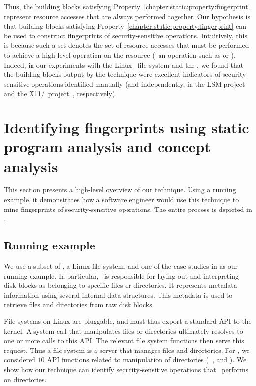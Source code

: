 Thus, the building blocks satisfying
Property~\ref{chapter:static:property:fingerprint} represent resource accesses
that are always performed together. Our hypothesis is that building blocks
satisfying Property~\ref{chapter:static:property:fingerprint} can be used to
construct fingerprints of security-sensitive operations. Intuitively, this is
because such a set denotes the set of resource accesses that must be performed
to achieve a high-level operation on the resource (\eg~an operation such as
 or ).  Indeed, in our experiments with
the Linux \ext\ file system and the \xserver, we found that the building blocks
output by the technique were excellent indicators of security-sensitive
operations identified manually (and independently, in the LSM
project~\cite{wcs+02} and the X11/\selinux~project~\cite{ksv03}, respectively).


\section{Identifying fingerprints using static program analysis and concept
analysis} 
\label{chapter:static:overview}

This section presents a high-level overview of our technique. Using a running
example, it demonstrates how a software engineer would use this technique to
mine fingerprints of security-sensitive operations. The entire process is 
depicted in .

\subsection{Running example} 
%
We use a subset of \ext, a Linux file system, and one of the case studies in
 as our running example. In particular,
\ext\ is responsible for laying out and interpreting disk blocks as belonging
to specific files or directories. It represents metadata information using
several internal data structures. This metadata is used to retrieve files and
directories from raw disk blocks.

File systems on Linux are pluggable, and must thus export a standard API to the
kernel. A system call that manipulates files or directories ultimately resolves
to one or more calls to this API. The relevant file system functions then serve
this request. Thus a file system is a server that manages files and
directories.  For \ext,  we considered  $10$ API functions related to
manipulation of directories (\eg~,  and
). We show how our technique can identify
security-sensitive operations that \ext\ performs on directories.

